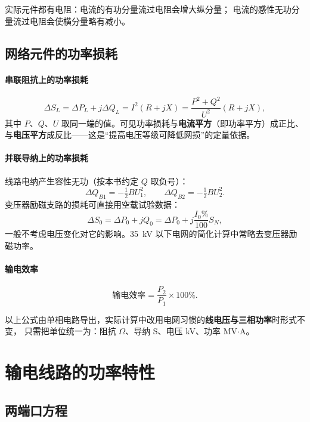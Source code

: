 实际元件都有电阻：电流的有功分量流过电阻会增大纵分量；
电流的感性无功分量流过电阻会使横分量略有减小。

\subsection{网络元件的功率损耗}

\paragraph{串联阻抗上的功率损耗}
\begin{equation}
  \Delta S_L=\Delta P_L+j\Delta Q_L=I^{2}(R+jX)
  =\frac{P^{2}+Q^{2}}{U^{2}}(R+jX),
\end{equation}
其中 $P$、$Q$、$U$ 取同一端的值。可见功率损耗与\textbf{电流平方}（即功率平方）成正比、
与\textbf{电压平方}成反比——这是“提高电压等级可降低网损”的定量依据。

\paragraph{并联导纳上的功率损耗}
线路电纳产生容性无功（按本书约定 $Q$ 取负号）：
\begin{equation}
  \Delta Q_{B1}=-\tfrac{1}{2}BU_1^{2},\qquad \Delta Q_{B2}=-\tfrac{1}{2}BU_2^{2}.
\end{equation}
变压器励磁支路的损耗可直接用空载试验数据：
\begin{equation}
  \Delta S_0=\Delta P_0+jQ_0=\Delta P_0+j\frac{I_0\%}{100}S_N ,
\end{equation}
一般不考虑电压变化对它的影响。35~kV 以下电网的简化计算中常略去变压器励磁功率。

\paragraph{输电效率}
\begin{equation}
  \text{输电效率}=\frac{P_2}{P_1}\times 100\% .
\end{equation}

以上公式由单相电路导出，实际计算中改用电网习惯的\textbf{线电压与三相功率}时形式不变，
只需把单位统一为：阻抗 $\Omega$、导纳 S、电压 kV、功率 MV$\cdot$A。

\section{输电线路的功率特性}

\subsection{两端口方程}


